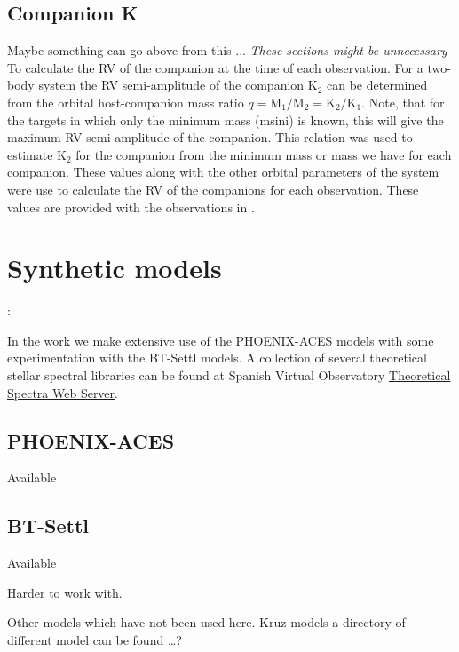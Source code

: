\subsection{Companion K}  Maybe something can go above from this ...
\label{sec:companion_RV}
\emph{These sections might be unnecessary}\\

To calculate the {RV} of the companion at the time of each observation. For a two-body system the {RV} semi-amplitude of the companion \(\textrm{K}_{2}\) can be determined from the orbital host-companion mass ratio $q = \textrm{M}_{1}/\textrm{M}_{2} = \textrm{K}_{2}/\textrm{K}_{1}$.
Note, that for the targets in which only the minimum mass (msini) is known, this will give the maximum {RV} semi-amplitude of the companion.
This relation was used to estimate \(\textrm{K}_2\) for the companion from the minimum mass or mass we have for each companion. These values along with the other orbital parameters of the system were use to calculate the {RV} of the companions for each observation. These values are provided with the observations in .


\section{Synthetic models}:

In the work we make extensive use of the {PHOENIX-ACES} models with some experimentation with the {BT-Settl} models.
A collection of several theoretical stellar spectral libraries can be found at Spanish Virtual Observatory \href{http://svo2.cab.inta-csic.es/theory/newov/index.php}{Theoretical Spectra Web Server}.

\subsection{PHOENIX-ACES}

Available 


\subsection{BT-Settl}

Available  

Harder to work with.

Other models which have not been used here. Kruz models a directory of different model can be found \ldots{}?

